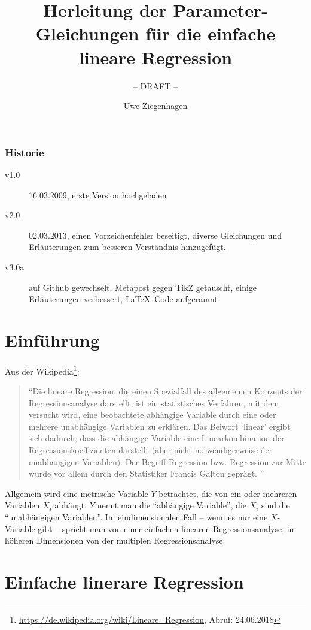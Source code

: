 \documentclass[ngerman, 12pt]{scrartcl}
\title{Herleitung der Parameter-Gleichungen für die einfache lineare Regression}
\subtitle{-- DRAFT --}
\author{Uwe Ziegenhagen}
\begin{document}
\maketitle

\subsubsection*{Historie}

\begin{description}
\item[v1.0] 16.03.2009, erste Version hochgeladen
\item[v2.0] 02.03.2013, einen Vorzeichenfehler beseitigt, diverse Gleichungen und Erläuterungen zum besseren Verständnis hinzugefügt.
\item [v3.0a] auf Github gewechselt, Metapost gegen TikZ getauscht, einige Erläuterungen verbessert, \LaTeX\ Code aufgeräumt
\end{description}

\section{Einführung}

Aus der Wikipedia\footnote{\url{https://de.wikipedia.org/wiki/Lineare_Regression}, Abruf: 24.06.2018}: 

\begin{quote}
\enquote{Die lineare Regression, die einen Spezialfall des allgemeinen Konzepts der Regressionsanalyse darstellt, ist ein statistisches Verfahren, mit dem versucht wird, eine beobachtete abhängige Variable durch eine oder mehrere unabhängige Variablen zu erklären. Das Beiwort \enquote{linear} ergibt sich dadurch, dass die abhängige Variable eine Linearkombination der Regressionskoeffizienten darstellt (aber nicht notwendigerweise der unabhängigen Variablen). Der Begriff Regression bzw. Regression zur Mitte wurde vor allem durch den Statistiker Francis Galton geprägt. 
}\end{quote}

Allgemein wird eine metrische Variable $Y$ betrachtet, die von ein oder mehreren Variablen $X_i$ abhängt. $Y$ nennt man die \enquote{abhängige Variable}, die $X_i$ sind die \enquote{unabhängigen Variablen}.  Im eindimensionalen Fall -- wenn es nur eine $X$-Variable gibt -- spricht man von einer einfachen linearen Regressionsanalyse, in höheren Dimensionen von der multiplen Regressionsanalyse.


\section{Einfache linerare Regression}
\end{document}
